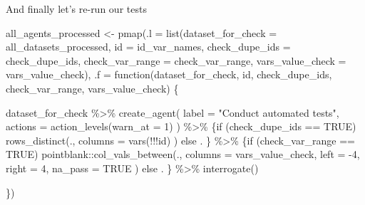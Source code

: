 \documentclass[
  letterpaper,
  DIV=11,
  numbers=noendperiod]{scrreprt}
\newenvironment{Shaded}{\begin{snugshade}}{\end{snugshade}}
\newcommand{\AttributeTok}[1]{\textcolor[rgb]{0.40,0.45,0.13}{#1}}
\newcommand{\ConstantTok}[1]{\textcolor[rgb]{0.56,0.35,0.01}{#1}}
\newcommand{\ControlFlowTok}[1]{\textcolor[rgb]{0.00,0.23,0.31}{#1}}
\newcommand{\DecValTok}[1]{\textcolor[rgb]{0.68,0.00,0.00}{#1}}
\newcommand{\FunctionTok}[1]{\textcolor[rgb]{0.28,0.35,0.67}{#1}}
\newcommand{\NormalTok}[1]{\textcolor[rgb]{0.00,0.23,0.31}{#1}}
\newcommand{\OtherTok}[1]{\textcolor[rgb]{0.00,0.23,0.31}{#1}}
\newcommand{\SpecialCharTok}[1]{\textcolor[rgb]{0.37,0.37,0.37}{#1}}
\newcommand{\StringTok}[1]{\textcolor[rgb]{0.13,0.47,0.30}{#1}}
\begin{document}
And finally let's re-run our tests

\begin{Shaded}
\begin{Highlighting}[]
\NormalTok{all\_agents\_processed }\OtherTok{\textless{}{-}} \FunctionTok{pmap}\NormalTok{(}\AttributeTok{.l =} \FunctionTok{list}\NormalTok{(}\AttributeTok{dataset\_for\_check =}\NormalTok{ all\_datasets\_processed, }\AttributeTok{id =}\NormalTok{ id\_var\_names, }
                                    \AttributeTok{check\_dupe\_ids =}\NormalTok{ check\_dupe\_ids, }\AttributeTok{check\_var\_range =}\NormalTok{ check\_var\_range,}
                                    \AttributeTok{vars\_value\_check =}\NormalTok{ vars\_value\_check),}
                               \AttributeTok{.f =} \ControlFlowTok{function}\NormalTok{(dataset\_for\_check,}
\NormalTok{                                             id,}
\NormalTok{                                             check\_dupe\_ids,}
\NormalTok{                                             check\_var\_range,}
\NormalTok{                                             vars\_value\_check) \{}
    
\NormalTok{    dataset\_for\_check }\SpecialCharTok{\%\textgreater{}\%}
      \FunctionTok{create\_agent}\NormalTok{(}
        \AttributeTok{label =} \StringTok{"Conduct automated tests"}\NormalTok{,}
        \AttributeTok{actions =} \FunctionTok{action\_levels}\NormalTok{(}\AttributeTok{warn\_at =} \DecValTok{1}\NormalTok{)}
\NormalTok{      ) }\SpecialCharTok{\%\textgreater{}\%}
\NormalTok{      \{}\ControlFlowTok{if}\NormalTok{ (check\_dupe\_ids }\SpecialCharTok{==} \ConstantTok{TRUE}\NormalTok{)}
        \FunctionTok{rows\_distinct}\NormalTok{(.,}
          \AttributeTok{columns =} \FunctionTok{vars}\NormalTok{(}\SpecialCharTok{!!!}\NormalTok{id)}
\NormalTok{          )}
        \ControlFlowTok{else}\NormalTok{ .}
\NormalTok{        \} }\SpecialCharTok{\%\textgreater{}\%}
\NormalTok{      \{}\ControlFlowTok{if}\NormalTok{ (check\_var\_range }\SpecialCharTok{==} \ConstantTok{TRUE}\NormalTok{)}
\NormalTok{        pointblank}\SpecialCharTok{::}\FunctionTok{col\_vals\_between}\NormalTok{(.,}
          \AttributeTok{columns =}\NormalTok{ vars\_value\_check,}
          \AttributeTok{left =} \SpecialCharTok{{-}}\DecValTok{4}\NormalTok{,}
          \AttributeTok{right =} \DecValTok{4}\NormalTok{,}
          \AttributeTok{na\_pass =} \ConstantTok{TRUE}
\NormalTok{        )}
        \ControlFlowTok{else}\NormalTok{ .}
\NormalTok{        \} }\SpecialCharTok{\%\textgreater{}\%} 
      \FunctionTok{interrogate}\NormalTok{()}

  
\NormalTok{\})}
\end{Highlighting}
\end{Shaded}
\end{document}
